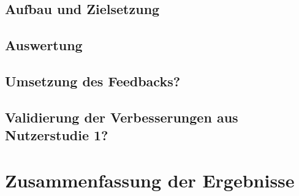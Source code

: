\subsection{Aufbau und Zielsetzung}\label{sec:AufbauNutzerstudie2}

\subsection{Auswertung}\label{sec:AuswertungNutzerStudie2}

\subsection{Umsetzung des Feedbacks?}\label{sec:UmsetzungFeedbackNutzerstudie2}

\subsection{Validierung der Verbesserungen aus Nutzerstudie 1?}\label{sec:ValidierungNutzerstudie2}

\section{Zusammenfassung der Ergebnisse}\label{sec:ZusammenfassungNutzerstudien}

